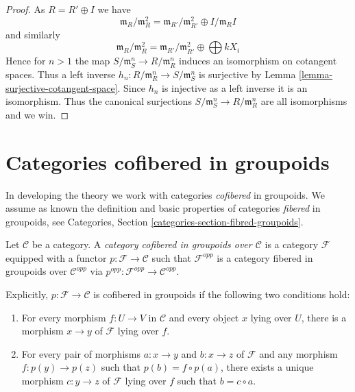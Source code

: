 \begin{proof}
As $R = R' \oplus I$ we have
$$
\mathfrak m_R/\mathfrak m_R^2 =
\mathfrak m_{R'}/\mathfrak m_{R'}^2 \oplus I/\mathfrak m_RI
$$
and similarly
$$
\mathfrak m_R/\mathfrak m_R^2 =
\mathfrak m_{R'}/\mathfrak m_{R'}^2 \oplus \bigoplus kX_i
$$
Hence for $n > 1$ the map $S/\mathfrak m_S^n \to R/\mathfrak m_R^n$
induces an isomorphism on cotangent spaces. Thus a left inverse
$h_n : R/\mathfrak m_R^n \to S/\mathfrak m_S^n$ is surjective by
Lemma \ref{lemma-surjective-cotangent-space}.
Since $h_n$ is injective as a left inverse it is an isomorphism.
Thus the canonical surjections $S/\mathfrak m_S^n \to R/\mathfrak m_R^n$
are all isomorphisms and we win.
\end{proof}




\section{Categories cofibered in groupoids}
\label{section-preliminary}

\noindent
In developing the theory we work with categories {\it cofibered} in groupoids. 
 We assume as known the definition and basic properties of categories 
{\it fibered} in groupoids, see
Categories, Section \ref{categories-section-fibred-groupoids}.

\begin{definition}
\label{definition-category-cofibred-groupoids}
Let $\mathcal{C}$ be a category.  A {\it category cofibered in groupoids over 
$\mathcal{C}$} is a category $\mathcal{F}$ equipped with a functor
$p: \mathcal{F} \to \mathcal{C}$ such that $\mathcal{F}^{opp}$ is a category 
fibered in groupoids over $\mathcal{C}^{opp}$ via
$p^{opp}: \mathcal{F}^{opp} \to \mathcal{C}^{opp}$.
\end{definition}

\noindent
Explicitly, $p: \mathcal{F} \to \mathcal{C}$ is cofibered in groupoids if 
the following two conditions hold:
\begin{enumerate}
\item For every morphism $f: U \to V$ in $\mathcal{C}$ and every object 
$x$ lying over $U$, there is a morphism $x \to y$ of $\mathcal{F}$ lying 
over $f$.
\item For every pair of morphisms $a: x \to y$ and $b: x \to z$ 
of $\mathcal{F}$ and any morphism $f: p(y) \to p(z)$ such that $p(b) = f 
\circ p(a)$, there exists a unique morphism $c: y \to z$ of $\mathcal 
F$ lying over $f$ such that $b = c \circ a$.
\end{enumerate}

